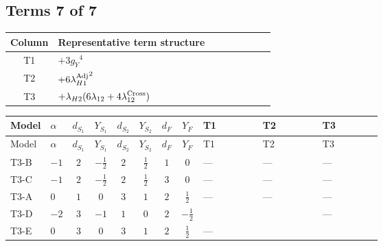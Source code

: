 \documentclass[8pt]{article}
\begin{document}
\begin{landscape}
\subsection*{Terms 7 of 7}
\begin{center}
\begin{tabular}{@{}c >{\raggedright\arraybackslash}p{0.82\linewidth}@{}}
\toprule
Column & Representative term structure \\
\midrule
T1 & \(\displaystyle +3 {g_Y}^4\) \\
\midrule
T2 & \(\displaystyle +6 {\lambda_{H1}^{\rm Adj}}^2\) \\
\midrule
T3 & \(\displaystyle +{\lambda_{H2}} (6 {\lambda_{12}}+4 {\lambda_{12}^{\rm Cross}})\) \\
\midrule
\bottomrule
\end{tabular}
\end{center}
\smallskip
\tiny
\begin{longtable}{@{}llcccccc >{\raggedright\arraybackslash}p{0.21\linewidth} >{\raggedright\arraybackslash}p{0.21\linewidth} >{\raggedright\arraybackslash}p{0.21\linewidth}@{}}
\toprule
Model & $\alpha$ & $d_{S_1}$ & $Y_{S_1}$ & $d_{S_2}$ & $Y_{S_2}$ & $d_F$ & $Y_F$ & T1 & T2 & T3 \\
\midrule
\endfirsthead
\toprule
Model & $\alpha$ & $d_{S_1}$ & $Y_{S_1}$ & $d_{S_2}$ & $Y_{S_2}$ & $d_F$ & $Y_F$ & T1 & T2 & T3 \\
\midrule
\endhead
T3-B & $-1$ & $2$ & $-\frac{1}{2}$ & $2$ & $\frac{1}{2}$ & $1$ & $0$ & --- & --- & --- \\
\midrule
T3-C & $-1$ & $2$ & $-\frac{1}{2}$ & $2$ & $\frac{1}{2}$ & $3$ & $0$ & --- & --- & --- \\
\midrule
T3-A & $0$ & $1$ & $0$ & $3$ & $1$ & $2$ & $\frac{1}{2}$ & --- & --- & --- \\
\midrule
T3-D & $-2$ & $3$ & $-1$ & $1$ & $0$ & $2$ & $-\frac{1}{2}$ & \scriptsize\adjustbox{max width=\linewidth}{$\begin{gathered} +3 {g_Y}^4\end{gathered}$} & \scriptsize\adjustbox{max width=\linewidth}{$\begin{gathered} +6 {\lambda_{H1}^{\rm Adj}}^2\end{gathered}$} & --- \\
\midrule
T3-E & $0$ & $3$ & $0$ & $3$ & $1$ & $2$ & $\frac{1}{2}$ & --- & \scriptsize\adjustbox{max width=\linewidth}{$\begin{gathered} +6 {\lambda_{H1}^{\rm Adj}}^2\end{gathered}$} & \scriptsize\adjustbox{max width=\linewidth}{$\begin{gathered} +{\lambda_{H2}} (6 {\lambda_{12}}+4 {\lambda_{12}^{\rm Cross}})\end{gathered}$} \\
\midrule
\bottomrule
\end{longtable}
\clearpage

\end{landscape}
\end{document}
